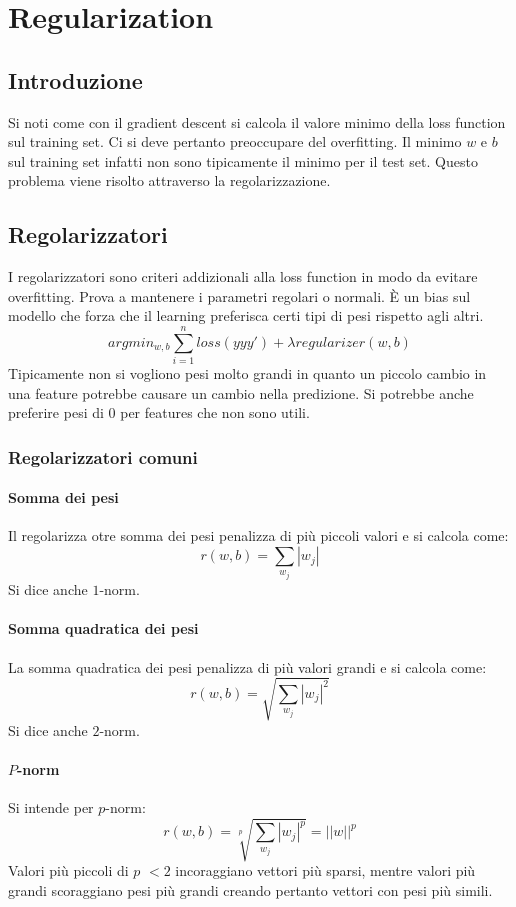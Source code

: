 \chapter{Regularization}

\section{Introduzione}
Si noti come con il gradient descent si calcola il valore minimo della loss function sul training set.
Ci si deve pertanto preoccupare del overfitting.
Il minimo $w$ e $b$ sul training set infatti non sono tipicamente il minimo per il test set.
Questo problema viene risolto attraverso la regolarizzazione.

\section{Regolarizzatori}
I regolarizzatori sono criteri addizionali alla loss function in modo da evitare overfitting.
Prova a mantenere i parametri regolari o normali.
\`E un bias sul modello che forza che il learning preferisca certi tipi di pesi rispetto agli altri.
$$argmin_{w,b}\sum\limits_{i=1}^nloss(yyy')+\lambda regularizer(w,b)$$
Tipicamente non si vogliono pesi molto grandi in quanto un piccolo cambio in una feature potrebbe causare un cambio nella predizione.
Si potrebbe anche preferire pesi di $0$ per features che non sono utili.

	\subsection{Regolarizzatori comuni}

		\subsubsection{Somma dei pesi}
		Il regolarizza otre somma dei pesi penalizza di pi\`u piccoli valori e si calcola come:
		$$r(w,b)=\sum\limits_{w_j}|w_j|$$
		Si dice anche $1$-norm.

		\subsubsection{Somma quadratica dei pesi}
		La somma quadratica dei pesi penalizza di pi\`u valori grandi e si calcola come:
		$$r(w,b)=\sqrt{\sum\limits_{w_j}|w_j|^2}$$
		Si dice anche $2$-norm.

		\subsubsection{$P$-norm}
		Si intende per $p$-norm:
		$$r(w,b)=\sqrt[p]{\sum\limits_{w_j}|w_j|^p}=||w||^p$$
		Valori pi\`u piccoli di $p$ $<2$ incoraggiano vettori pi\`u sparsi, mentre valori pi\`u grandi scoraggiano pesi pi\`u grandi creando pertanto vettori con pesi pi\`u simili.

